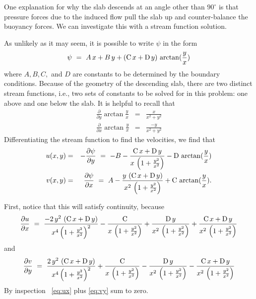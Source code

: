 \documentclass[12pt,twoside]{article}
\begin{document}
One explanation for why the slab descends at an angle other than $90^\circ$ is
that pressure forces due to the induced flow pull the slab up and
counter-balance the buoyancy forces.  We can investigate this with a stream
function solution.

As unlikely as it may seem, it is possible to write $\psi$ in the form
\begin{equation}
\psi ~=~ A\,x + B\,y + \left( {\rm C}\,x + {\rm D}\,y \right) \,
   \arctan ({y\over x})
\end{equation}
where $A, B, C,$ and  $D$ are constants to be determined by the boundary
conditions.   Because of the geometry of the descending slab, there are two
distinct stream functions, i.e., two sets of constants to be solved for in this
problem: one above and one below the slab.
It is helpful to recall that
\begin{eqnarray}
\frac{\partial}{\partial y} \arctan \frac{y}{x} & = & \frac{x}{x^2+y^2} \\
\frac{\partial}{\partial x} \arctan \frac{y}{x} & = & \frac{-y}{x^2+y^2} 
\end{eqnarray}
Differentiating the stream function to find the velocities, we find that
\begin{eqnarray}
u(x,y) & = & -\frac{\partial\psi}{\partial y} ~=~ -B - {{{\rm C}\,x + {\rm
D}\,y}\over{x\,\left( 1 + {{{y^2}}\over {{x^2}}} \right) }} - 
  {\rm D}\,\arctan ({y\over x}) \\
v(x,y) & = & \frac{\partial\psi}{\partial x} ~=~ A - {{y\,\left( {\rm C}\,x +
{\rm D}\,y \right) }\over{{x^2}\,\left( 1 + {{{y^2}}\over {{x^2}}} \right) }} + 
  {\rm C}\,\arctan ({y\over x}).
\end{eqnarray}

First, notice that this will satisfy continuity, because
\begin{equation}
\frac{\partial u}{\partial x} ~=~ {{-2\,{y^2}\,\left( {\rm C}\,x + {\rm D}\,y
\right) }\over 
    {{x^4}\,{{\left( 1 + {{{y^2}}\over {{x^2}}} \right) }^
        2}}} - {{{\rm C}}\over 
    {x\,\left( 1 + {{{y^2}}\over {{x^2}}} \right) }} + 
  {{{\rm D}\,y}\over 
    {{x^2}\,\left( 1 + {{{y^2}}\over {{x^2}}} \right) }} + 
  {{{\rm C}\,x + {\rm D}\,y}\over 
    {{x^2}\,\left( 1 + {{{y^2}}\over {{x^2}}} \right) }} \label{eq:ux}
\end{equation}
and
\begin{equation}
\frac{\partial v}{\partial y} ~=~{{2\,{y^2}\,\left( {\rm C}\,x + {\rm D}\,y
\right) }\over 
    {{x^4}\,{{\left( 1 + {{{y^2}}\over {{x^2}}} \right) }^
        2}}} + {{{\rm C}}\over 
    {x\,\left( 1 + {{{y^2}}\over {{x^2}}} \right) }} - 
  {{{\rm D}\,y}\over 
    {{x^2}\,\left( 1 + {{{y^2}}\over {{x^2}}} \right) }} - 
  {{{\rm C}\,x + {\rm D}\,y}\over 
    {{x^2}\,\left( 1 + {{{y^2}}\over {{x^2}}} \right) }} \label{eq:vy}
\end{equation}
By inspection ~\ref{eq:ux} plus \ref{eq:vy} sum to zero.
\end{document}
